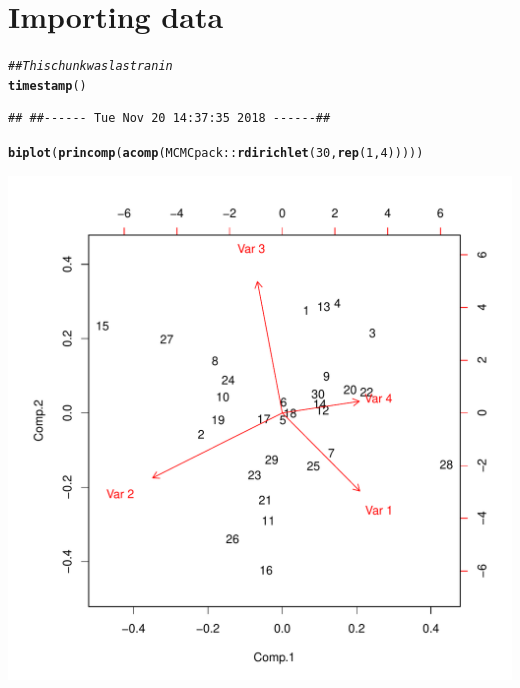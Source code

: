 \documentclass{article}\usepackage[]{graphicx}\usepackage[]{color}
\makeatletter
\def\maxwidth{ %
  \ifdim\Gin@nat@width>\linewidth
    \linewidth
  \else
    \Gin@nat@width
  \fi
}
\newcommand{\hlnum}[1]{\textcolor[rgb]{0.686,0.059,0.569}{#1}}%
\newcommand{\hlcom}[1]{\textcolor[rgb]{0.678,0.584,0.686}{\textit{#1}}}%
\newcommand{\hlopt}[1]{\textcolor[rgb]{0,0,0}{#1}}%
\newcommand{\hlstd}[1]{\textcolor[rgb]{0.345,0.345,0.345}{#1}}%
\newcommand{\hlkwd}[1]{\textcolor[rgb]{0.737,0.353,0.396}{\textbf{#1}}}%
\newenvironment{kframe}{%
 \def\at@end@of@kframe{}%
 \ifinner\ifhmode%
  \def\at@end@of@kframe{\end{minipage}}%
  \begin{minipage}{\columnwidth}%
 \fi\fi%
 \def\FrameCommand##1{\hskip\@totalleftmargin \hskip-\fboxsep
 \colorbox{shadecolor}{##1}\hskip-\fboxsep
     \hskip-\linewidth \hskip-\@totalleftmargin \hskip\columnwidth}%
 \MakeFramed {\advance\hsize-\width
   \@totalleftmargin\z@ \linewidth\hsize
   \@setminipage}}%
 {\par\unskip\endMakeFramed%
 \at@end@of@kframe}
\newenvironment{knitrout}{}{} %
\makeatother
\begin{document}
\section{Importing data}
\begin{knitrout}
\color{fgcolor}\begin{kframe}
\begin{alltt}
\hlcom{## This chunk was last ran in}
\hlkwd{timestamp}\hlstd{()}
\end{alltt}
\begin{verbatim}
## ##------ Tue Nov 20 14:37:35 2018 ------##
\end{verbatim}
\begin{alltt}
\hlkwd{biplot}\hlstd{(}\hlkwd{princomp}\hlstd{(}\hlkwd{acomp}\hlstd{(MCMCpack}\hlopt{::}\hlkwd{rdirichlet}\hlstd{(}\hlnum{30}\hlstd{,} \hlkwd{rep}\hlstd{(}\hlnum{1}\hlstd{,} \hlnum{4}\hlstd{)))))}
\end{alltt}
\end{kframe}
\includegraphics[width=\maxwidth]{figure/unnamed-chunk-7-1} 

\end{knitrout}
\end{document}
